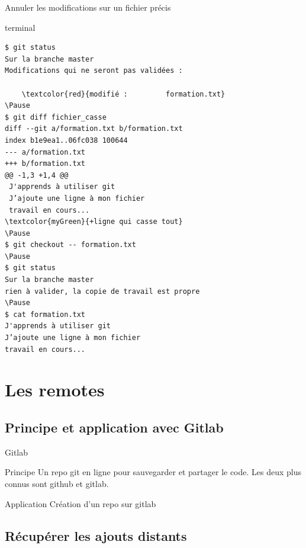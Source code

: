 \documentclass[usepdftitle=false]{beamer}
\def\seplength{.3\topsep}
\newcommand{\Pause}{%
\ifdef{\Release}
  {\pause}
  {}
}
\begin{document}
\begin{frame}[fragile]{Annuler les modifications sur un fichier précis}
	\begin{beamercolorbox}[rounded=true,shadow=true]{terminal}
\vspace{-\seplength}
\begin{Verbatim}
$ git status
Sur la branche master
Modifications qui ne seront pas validées :

	\textcolor{red}{modifié :         formation.txt}
\Pause
$ git diff fichier_casse
diff --git a/formation.txt b/formation.txt
index b1e9ea1..06fc038 100644
--- a/formation.txt
+++ b/formation.txt
@@ -1,3 +1,4 @@
 J'apprends à utiliser git
 J’ajoute une ligne à mon fichier
 travail en cours...
\textcolor{myGreen}{+ligne qui casse tout}
\Pause
$ git checkout -- formation.txt
\Pause
$ git status
Sur la branche master
rien à valider, la copie de travail est propre
\Pause
$ cat formation.txt
J'apprends à utiliser git
J’ajoute une ligne à mon fichier
travail en cours...
\end{Verbatim}
	\end{beamercolorbox}
\end{frame}

\section{Les remotes}

\subsection{Principe et application avec Gitlab}

\begin{frame}{Gitlab}
	\begin{block}{Principe}
		Un repo git en ligne pour sauvegarder et partager le code. Les deux plus connus sont github et gitlab.
	\end{block}
	\begin{block}{Application}
		Création d'un repo sur gitlab
	\end{block}
\end{frame}

\subsection{Récupérer les ajouts distants}
\end{document}
